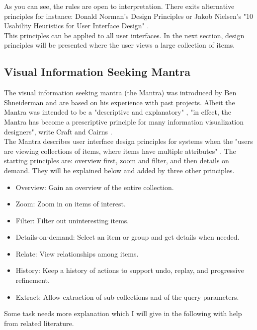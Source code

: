 \documentclass[11pt]{report}
\begin{document}
{{As you can see, the rules are open to interpretation. There exits alternative principles for instance: Donald Norman's Design Principles \cite{Norman2013} or Jakob Nielsen's "10 Usability Heuristics for User Interface Design" \cite{Nielsen1995}. \\

This principles can be applied to all user interfaces. In the next section, design principles will be presented where the user views a large collection of items.

\subsection{Visual Information Seeking Mantra}

The visual information seeking mantra (the Mantra) was introduced by Ben Shneiderman \cite{Shneiderman1996} and are based on his experience with past projects. Albeit the Mantra was intended to be a "descriptive and explanatory" \cite{Card1999}, "in effect, the Mantra has become a prescriptive principle for many information visualization designers", write Craft and Cairns \cite{Craft2005}. \\

The Mantra describes user interface design principles for systems when the "users are viewing collections of items, where items have multiple attributes" \cite{Shneiderman1996}. The starting principles are: overview first, zoom and filter, and then details on demand. They will be explained below and added by three other principles. \\

\begin{itemize}
	\item Overview: Gain an overview of the entire collection.
	\item Zoom: Zoom in on items of interest.
	\item Filter: Filter out uninteresting items.
	\item Details-on-demand: Select an item or group and get details when needed.
	\item Relate: View relationships among items.
	\item History: Keep a history of actions to support undo, replay, and progressive refinement.
	\item Extract: Allow extraction of sub-collections and of the query parameters.
\end{itemize}

Some task needs more explanation which I will give in the following with help from related literature.

}}
\end{document}
